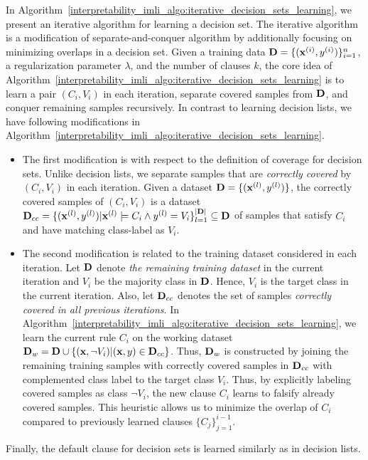 In Algorithm~\ref{interpretability_imli_algo:iterative_decision_sets_learning}, we present an iterative algorithm for learning a decision set. The iterative algorithm is a modification of separate-and-conquer algorithm  by additionally focusing on minimizing overlaps in a decision set.  Given a training data $ \mathbf{D} = \{(\mathbf{x}^{(i)}, y^{(i)})\}_{i=1}^n $, a  regularization parameter $ \lambda $, and the number of clauses $ k $, the core idea of Algorithm~\ref{interpretability_imli_algo:iterative_decision_sets_learning} is to learn a pair $ (C_i,V_i) $ in each iteration, separate covered samples from $ \mathbf{D} $, and conquer remaining samples recursively. In contrast to learning decision lists, we have following modifications in Algorithm~\ref{interpretability_imli_algo:iterative_decision_sets_learning}. 

\begin{itemize}
	\item The first modification is with respect to the definition of coverage for decision sets. Unlike decision lists, we separate samples that are \textit{correctly covered} by $ (C_i, V_i) $ in each iteration. Given  a dataset $ \mathbf{D} = \{(\mathbf{x}^{(l)}, y^{(l)})\}$, the correctly covered samples of $ (C_i, V_i) $ is a dataset $ \mathbf{D}_{cc}  =  \{(\mathbf{x}^{(l)}, y^{(l)}) | \mathbf{x}^{(l)} \models C_i \wedge y^{(l)} = V_i \}_{l=1}^{|\mathbf{D}|} \subseteq \mathbf{D} $ of samples that satisfy $ C_i $ and have matching class-label as $ V_i $. 
	\item The second modification is related to the  training dataset considered in each iteration. Let $ \mathbf{D} $ denote \emph{the remaining training dataset} in the current iteration and $ V_i $ be the majority class in  $ \mathbf{D} $. Hence, $ V_i $ is the target class in the current iteration. Also, let $ \mathbf{D}_{cc} $ denotes the set of samples \emph{correctly covered in all previous iterations}. In Algorithm~\ref{interpretability_imli_algo:iterative_decision_sets_learning}, we learn the current rule $ C_i $ on the working dataset $ \mathbf{D}_{w} = \mathbf{D}  \cup \{(\mathbf{x}, \neg V_i) | (\mathbf{x}, y) \in \mathbf{D}_{cc}\} $. Thus, $ \mathbf{D}_{w} $ is constructed by joining the remaining training samples with correctly covered samples in $ \mathbf{D}_{cc} $ with complemented class label to the target class $ V_i $.  Thus, by explicitly labeling covered samples as class $ \neg V_i $, the new clause $ C_i $ learns to falsify already covered samples. This heuristic allows us to minimize the overlap of $ C_i $ compared to previously learned clauses $ \{C_j\}_{j=1}^{i-1} $.
\end{itemize}

Finally, the default clause for decision sets is learned similarly as in decision lists. 





\newcommand{\maxsatquery}{\ensuremath{\mathsf{ConstructQuery}}}
\newcommand{\createclause}{\ensuremath{\mathsf{ConstructClause}}}
\newcommand{\iterativeClauseLearning}{\ensuremath{\mathsf{IterativeClauseLearning}}}
\let\oldReturn\Return
\renewcommand{\Return}{\State\oldReturn}